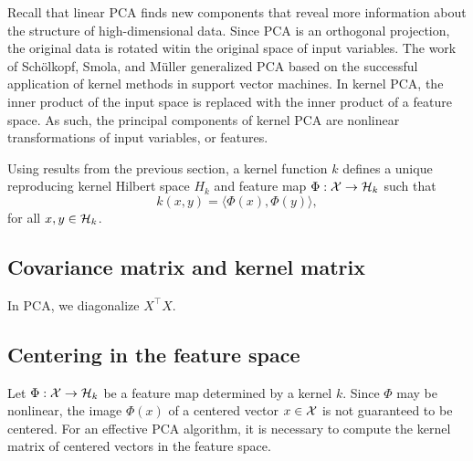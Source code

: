 Recall that linear PCA finds new components that reveal more information about the structure of high-dimensional data.
Since PCA is an orthogonal projection, the original data is rotated witin the original space of input variables.
The work of Sch\"olkopf, Smola, and M\"uller \cite{scholkopf1997kernel,scholkopf1998nonlinear} generalized PCA based on the successful application of kernel methods in support vector machines.
In kernel PCA, the inner product of the input space is replaced with the inner product of a feature space.
As such, the principal components of kernel PCA are nonlinear transformations of input variables, or features.

Using results from the previous section, a kernel function \(k\) defines a unique reproducing kernel Hilbert space \(H_k\) and feature map \(\Phi : \mathcal{X} \to \mathcal{H}_k\) such that
\begin{equation}
    \label{eqn:kernel-inner-product}
    k(x,y) = \langle \Phi(x), \Phi(y) \rangle,
\end{equation}
for all \(x, y \in \mathcal{H}_k\).

\subsection{Covariance matrix and kernel matrix}
In PCA, we diagonalize \(X^\top X\).

\subsection{Centering in the feature space}
\label{sec:centering-in-the-feature-space}
Let \(\Phi : \mathcal{X} \to \mathcal{H}_k\) be a feature map determined by a kernel \(k\).
Since \(\Phi\) may be nonlinear, the image \(\Phi(x)\) of a centered vector \(x \in \mathcal{X}\) is not guaranteed to be centered.
For an effective PCA algorithm, it is necessary to compute the kernel matrix of centered vectors in the feature space. \cite{scholkopf1998nonlinear}

